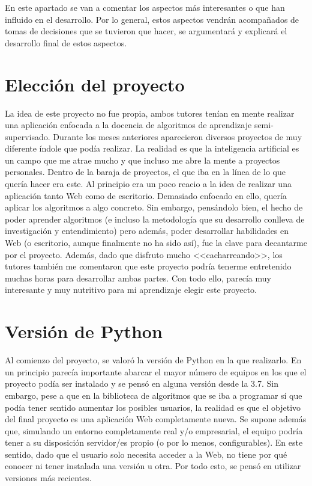 
En este apartado se van a comentar los aspectos más interesantes o que han
influido en el desarrollo. Por lo general, estos aspectos vendrán acompañados de
tomas de decisiones que se tuvieron que hacer, se argumentará y explicará el
desarrollo final de estos aspectos.

\section{Elección del proyecto}

La idea de este proyecto no fue propia, ambos tutores tenían en mente realizar
una aplicación enfocada a la docencia de algoritmos de aprendizaje
semi-supervisado. Durante los meses anteriores aparecieron diversos proyectos de
muy diferente índole que podía realizar. La realidad es que la inteligencia
artificial es un campo que me atrae mucho y que incluso me abre la mente a
proyectos personales. Dentro de la baraja de proyectos, el que iba en la línea
de lo que quería hacer era este. Al principio era un poco reacio a la idea de
realizar una aplicación tanto Web como de escritorio. Demasiado enfocado en
ello, quería aplicar los algoritmos a algo concreto. Sin embargo, pensándolo
bien, el hecho de poder aprender algoritmos (e incluso la metodología que su
desarrollo conlleva de investigación y entendimiento) pero además, poder
desarrollar habilidades en Web (o escritorio, aunque finalmente no ha sido así),
fue la clave para decantarme por el proyecto. Además, dado que disfruto mucho
<<cacharreando>>, los tutores también me comentaron que este proyecto podría
tenerme entretenido muchas horas para desarrollar ambas partes. Con todo ello,
parecía muy interesante y muy nutritivo para mi aprendizaje elegir este
proyecto.

\section{Versión de Python}

Al comienzo del proyecto, se valoró la versión de Python en la que realizarlo.
En un principio parecía importante abarcar el mayor número de equipos en los que
el proyecto podía ser instalado y se pensó en alguna versión desde la 3.7. Sin
embargo, pese a que en la biblioteca de algoritmos que se iba a programar sí que
podía tener sentido aumentar los posibles usuarios, la realidad es que el
objetivo del final proyecto es una aplicación Web completamente nueva. Se supone
además que, simulando un entorno completamente real y/o empresarial, el equipo
podría tener a su disposición servidor/es propio (o por lo menos,
configurables). En este sentido, dado que el usuario solo necesita acceder a la
Web, no tiene por qué conocer ni tener instalada una versión u otra. Por todo
esto, se pensó en utilizar versiones más recientes. 


